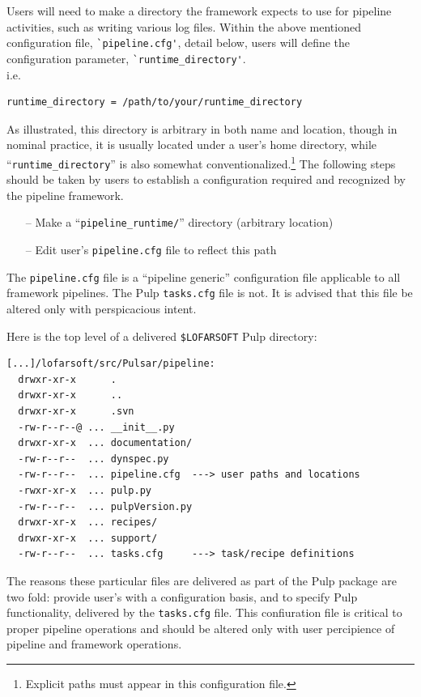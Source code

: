 \documentclass[a4paper,10pt,bibtotoc]{scrartcl}
\begin{document}
Users will need to make a directory the framework expects to use for
pipeline activities, such as writing various log files. Within the
above mentioned  configuration file, \verb|`pipeline.cfg'|, detail below,
users will define the configuration parameter, \verb|`runtime_directory'|.\\
i.e. 
\begin{verbatim}
runtime_directory = /path/to/your/runtime_directory
\end{verbatim}
As illustrated, this directory is arbitrary in both name and location,
though in nominal practice, it is usually located under a user's home
directory, while ``\verb|runtime_directory|'' is also somewhat conventionalized.\footnote{Explicit paths must appear in this configuration file.}
The following steps should be taken by users to establish a configuration required and recognized by the pipeline framework.
\begin{itemize}
\item[--] Make a ``\verb|pipeline_runtime/|'' directory (arbitrary location)
\item[--] Edit user's \verb|pipeline.cfg| file to reflect this path
\end{itemize}
The \verb|pipeline.cfg| file is a ``pipeline generic'' configuration
file applicable to all framework pipelines.  The Pulp \verb|tasks.cfg|
file is not.  It is advised that this file be altered only with
perspicacious intent.

Here is the top level of a delivered \verb|$LOFARSOFT| Pulp directory:
\begin{verbatim}
[...]/lofarsoft/src/Pulsar/pipeline:
  drwxr-xr-x      .
  drwxr-xr-x      ..
  drwxr-xr-x      .svn
  -rw-r--r--@ ... __init__.py
  drwxr-xr-x  ... documentation/
  -rw-r--r--  ... dynspec.py
  -rw-r--r--  ... pipeline.cfg  ---> user paths and locations
  -rwxr-xr-x  ... pulp.py
  -rw-r--r--  ... pulpVersion.py
  drwxr-xr-x  ... recipes/
  drwxr-xr-x  ... support/
  -rw-r--r--  ... tasks.cfg     ---> task/recipe definitions
\end{verbatim}
The reasons these particular files are delivered as part of the Pulp
package are two fold: provide user's with a configuration basis, and
to specify Pulp functionality, delivered by the
\verb|tasks.cfg| file.  This confiuration file is critical to proper
pipeline operations and should be altered only with user percipience of pipeline and framework operations.\\
\end{document}
